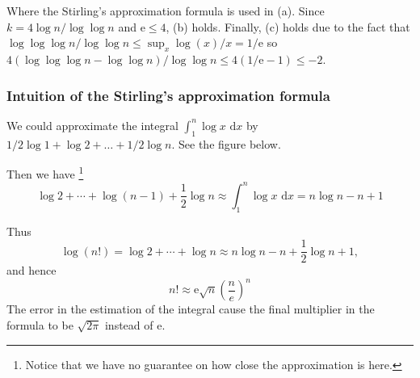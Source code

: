 \documentclass[12pt, a4paper]{article}
\newcommand{\eu}{\mathrm{e}}
\newcommand{\Intd}[1]{\,\mathrm{d}#1}
\theoremstyle{mystyle} %
\begin{document}
Where the Stirling's approximation formula is used in (a).
Since $k = 4 \log n / \log \log n$ and $\eu \leq 4$, (b) holds.
Finally, (c) holds due to the fact that $\log \log \log n / \log \log n \leq \sup_x \log(x) / x
= 1 / \eu$ so $4 (\log \log \log n - \log \log n) / \log \log n \leq 4 (1/\eu - 1) \leq -2$.

\subsubsection{Intuition of the Stirling's approximation formula}

We could approximate the integral $\int_1^n \log x \, \Intd{x}$ by $1/2 \log 1 + \log 2 + \dots + 1/2 \log n$.
See the figure below.

\begin{figure}[H]
  \centering
\end{figure}

Then we have \footnote{Notice that we have no guarantee on how close the approximation is here.}
\[
  \log 2 + \dotsm + \log (n\!-\!1) + \frac{1}{2} \log n \approx
  \int_{1}^{n} \log x \, \Intd{x} = n \log n - n + 1
\]

Thus
\[
  \log(n!) = \log 2 + \dotsm + \log n \approx n \log n - n + \frac{1}{2} \log n + 1,
\]
and hence
\[
  n! \approx \eu \sqrt{n} \left(\frac{n}{e}\right)^n
\]
The error in the estimation of the integral cause the final
multiplier in the formula to be $\sqrt{2 \pi}$ instead of $\eu$.
\end{document}
